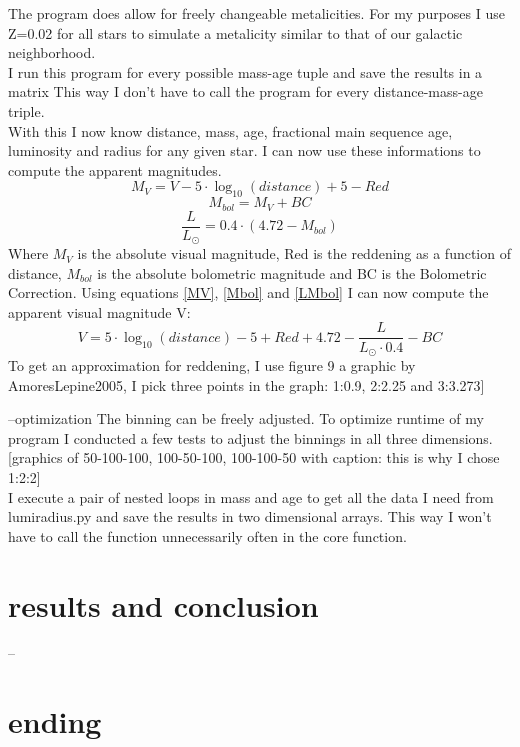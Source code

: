 \documentclass[a4paper,10pt]{article}
\begin{document}
 The program does allow for freely changeable metalicities. For my purposes I use Z=0.02 for all stars to simulate
 a metalicity similar to that of our galactic neighborhood.\\
 I run this program for every possible mass-age tuple and save the results in a matrix This way I don't have to call the program for
 every distance-mass-age triple.\\
 With this I now know distance, mass, age, fractional main sequence age, luminosity and radius for any given star. I can now use these 
 informations to compute the apparent magnitudes.
 \begin{equation}
  M_{V}=V-5\cdot\log_{10}(distance)+5-Red
  \label{MV}
 \end{equation}
 \begin{equation}
  M_{bol}=M_{V}+BC
  \label{Mbol}
 \end{equation}
 \begin{equation}
  \frac{L}{L_\odot}=0.4\cdot(4.72-M_{bol})
  \label{LMbol}
 \end{equation}
 Where $M_{V}$ is the absolute visual magnitude, Red is the reddening as a function of distance, $M_{bol}$ is the absolute bolometric 
 magnitude and BC is the Bolometric Correction. Using equations \ref{MV}, \ref{Mbol} and \ref{LMbol} I can now compute the apparent visual
 magnitude V:
 \begin{equation}
  V=5\cdot\log_{10}(distance)-5+Red+4.72-\frac{L}{L_\odot\cdot0.4}-BC
 \end{equation}
 To get an approximation for reddening, I use figure 9 a graphic by AmoresLepine2005, I pick three points in the graph: 1:0.9, 2:2.25 and
 3:3.273]



 
 
 --optimization
 The binning can be freely adjusted. To optimize runtime of my program I conducted a few tests to adjust the binnings in all three dimensions.
 [graphics of 50-100-100, 100-50-100, 100-100-50 with caption: this is why I chose 1:2:2]\\
 
 I execute a pair of nested loops in mass and age to get all the data I need from lumiradius.py and save the results in two dimensional
 arrays. This way I won't have to call the function unnecessarily often in the core function.
 \section{results and conclusion}
 --
 \section{ending}
\end{document}
